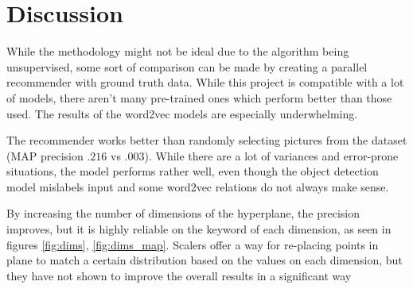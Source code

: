 \section{Discussion}
\label{sec:results_discussion}

While the methodology might not be ideal due to the algorithm being unsupervised, some sort of comparison can be made by creating a parallel recommender with ground truth data. While this project is compatible with a lot of models, there aren't many pre-trained ones which perform better than those used. The results of the word2vec models are especially underwhelming.

The recommender works better than randomly selecting pictures from the dataset (MAP precision $.216$ vs $.003$). While there are a lot of variances and error-prone situations, the model performs rather well, even though the object detection model mislabels input and some word2vec relations do not always make sense.

By increasing the number of dimensions of the hyperplane, the precision improves, but it is highly reliable on the keyword of each dimension, as seen in figures \ref{fig:dims}, \ref{fig:dims_map}. Scalers offer a way for re-placing points in plane to match a certain distribution based on the values on each dimension, but they have not shown to improve the overall results in a significant way

